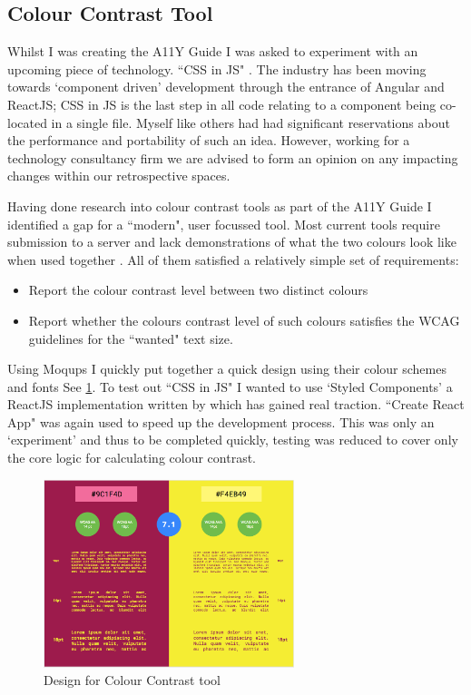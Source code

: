 \subsection{Colour Contrast Tool}
\label{sec:colour_contrast}
Whilst I was creating the A11Y Guide I was asked to experiment with an
upcoming piece of technology. ``CSS in JS" \citep{CSSInJS}. The industry has been moving
towards `component driven' development \citep{CDD} through the entrance of
Angular
and ReactJS; CSS in JS is the last step in all code relating to a
component being co-located in a single file. Myself like others had had
significant reservations \citep{AgainstCssInJs} about the performance and portability of
such an idea. However, working for a technology consultancy firm we are
advised to form an opinion on any impacting changes within our retrospective
spaces.

Having done research into colour contrast tools as part of the A11Y Guide I
identified a gap for a ``modern", user focussed tool. Most current tools
require submission to a server and lack demonstrations
of what the two colours look like when used together \cite*{JuicyStudio}. All
of them satisfied a relatively simple set of requirements:
\begin{itemize}
\item Report the colour contrast level between two distinct colours
\item Report whether the colours contrast level of such colours satisfies the
 WCAG guidelines for the ``wanted" text size.
\end{itemize}

Using Moqups \citep{Moqups} I quickly put together a quick design using
their colour schemes and fonts See \ref{fig:colour_contrast_1}. To test out
``CSS in JS" I wanted to use `Styled Components' a ReactJS implementation
written by \cite*{StyledComponents} which has gained real traction. ``Create
React App" was again used to speed up the development process. This was
only an `experiment' and thus to be completed quickly, testing was reduced to
cover only the core logic for calculating colour contrast.

\begin{figure}[H]
\centering
\includegraphics[width=0.65\textwidth]{figures/colour_contrast_1}
\captionsetup{justification=centering}
\caption{Design for Colour Contrast tool
\label{fig:colour_contrast_1}}
\end{figure}

